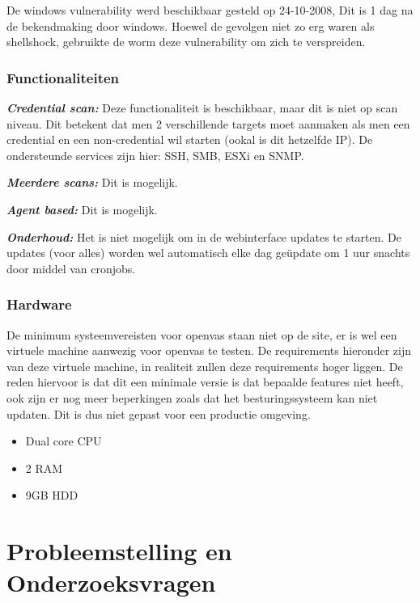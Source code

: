 De windows vulnerability werd beschikbaar gesteld op 24-10-2008, Dit is 1 dag na de bekendmaking door windows. Hoewel de gevolgen niet zo erg waren als shellshock, gebruikte de worm \textcite{Microsoft} deze vulnerability om zich te verspreiden.

\subsubsection{Functionaliteiten}
\textbf{\textit{Credential scan: }} Deze functionaliteit is beschikbaar, maar dit is niet op scan niveau. Dit betekent dat men 2 verschillende targets moet aanmaken als men een credential en een non-credential wil starten (ookal is dit hetzelfde IP). De ondersteunde services zijn hier: SSH, SMB, ESXi en SNMP.

\textbf{\textit{Meerdere scans: }} Dit is mogelijk.

\textbf{\textit{Agent based: }} Dit is mogelijk.


\textbf{\textit{Onderhoud: }} Het is niet mogelijk om in de webinterface updates te starten. De updates (voor alles) worden wel automatisch elke dag geüpdate om 1 uur snachts door middel van cronjobs.

\subsubsection{Hardware}
De minimum systeemvereisten voor openvas staan niet op de site, er is wel een virtuele machine aanwezig voor openvas te testen. De requirements hieronder zijn van deze virtuele machine, in realiteit zullen deze requirements hoger liggen. De reden hiervoor is dat dit een minimale versie is dat bepaalde features niet heeft, ook zijn er nog meer beperkingen zoals dat het besturingssysteem kan niet updaten. Dit is dus niet gepast voor een productie omgeving.

\begin{itemize}
\item Dual core CPU
\item 2 RAM
\item 9GB HDD
\end{itemize}

\textcite{Openvas-requirements}


\section{Probleemstelling en Onderzoeksvragen}
\label{sec:onderzoeksvragen}

